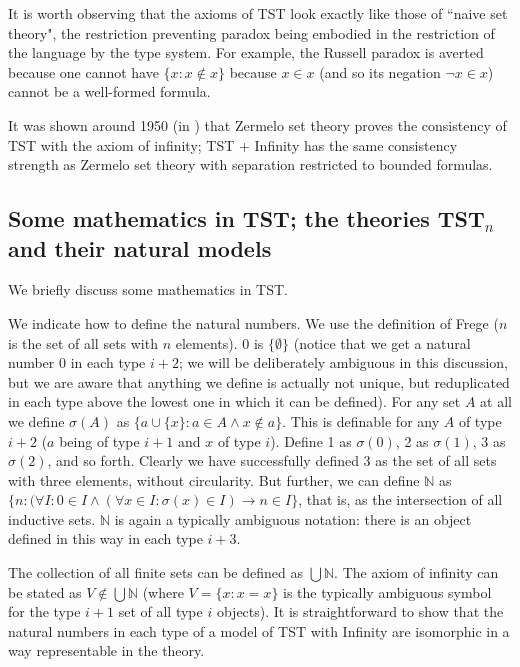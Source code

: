\documentclass[112pt]{article}
\begin{document}
It is worth observing that the axioms of TST look exactly like those of ``naive set theory", the restriction preventing paradox being embodied in the restriction of the language by the type system.
For example, the Russell paradox is averted because one cannot have $\{x:x \not\in x\}$ because $x \in x$ (and so its negation $\neg x \in x$) cannot be a well-formed formula.

It was shown around 1950 (in \cite{kemeny}) that Zermelo set theory proves the consistency of TST with the axiom of infinity;  TST + Infinity has the same consistency strength as
Zermelo set theory with separation restricted to bounded formulas.


\newpage

\subsection{Some mathematics in TST;  the theories TST$_n$ and their natural models}

We briefly discuss some mathematics in TST.

We indicate how to define the natural numbers.  We use the definition of Frege ($n$ is the set of all sets with $n$ elements).  0 is $\{\emptyset\}$ (notice that we get a natural number 0 in each type $i+2$;  we will be deliberately ambiguous in this discussion, but we are aware that anything we define is actually not unique, but reduplicated in each type above the lowest one in which it can be defined).  For any set $A$ at all we define $\sigma(A)$ as $\{a \cup \{x\}:a \in A \wedge x \not\in a\}$.  This is definable for any $A$ of type $i+2$ ($a$ being of type $i+1$ and $x$ of type $i$).  Define 1 as $\sigma(0)$, 2 as $\sigma(1)$,  3 as $\sigma(2)$, and so forth.  Clearly we have successfully defined 3 as the set of all sets with three elements, without circularity.
But further, we can define $\mathbb N$ as $\{n:(\forall I:0 \in I \wedge (\forall x \in I:\sigma(x) \in I) \rightarrow n \in I\}$, that is, as the intersection of all inductive sets.
$\mathbb N$ is again a typically ambiguous notation:  there is an object defined in this way in each type $i+3$.

The collection of all finite sets can be defined as $\bigcup \mathbb N$.  The axiom of infinity can be stated as $V \not\in \bigcup \mathbb N$ (where $V= \{x:x=x\}$ is the typically ambiguous symbol for the type $i+1$ set of all type $i$ objects).  It is straightforward to show that the natural numbers in each type of a model of TST with Infinity are isomorphic in a way representable in the theory.
\end{document}
